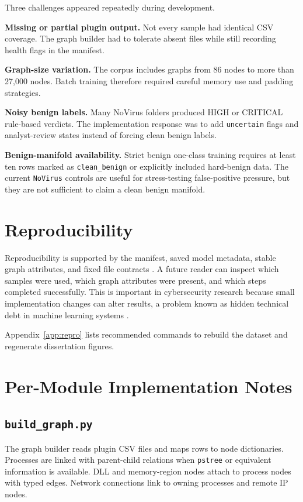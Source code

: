Three challenges appeared repeatedly during development.

\textbf{Missing or partial plugin output.} Not every sample had identical CSV coverage. The graph builder had to tolerate absent files while still recording health flags in the manifest.

\textbf{Graph-size variation.} The corpus includes graphs from 86 nodes to more than 27,000 nodes. Batch training therefore required careful memory use and padding strategies.

\textbf{Noisy benign labels.} Many NoVirus folders produced HIGH or CRITICAL rule-based verdicts. The implementation response was to add \texttt{uncertain} flags and analyst-review states instead of forcing clean benign labels.

\textbf{Benign-manifold availability.} Strict benign one-class training requires at least ten rows marked as \texttt{clean\_benign} or explicitly included hard-benign data. The current \texttt{NoVirus} controls are useful for stress-testing false-positive pressure, but they are not sufficient to claim a clean benign manifold.

\section{Reproducibility}

Reproducibility is supported by the manifest, saved model metadata, stable graph attributes, and fixed file contracts \cite{goodman2016reproducibility}. A future reader can inspect which samples were used, which graph attributes were present, and which steps completed successfully. This is important in cybersecurity research because small implementation changes can alter results, a problem known as hidden technical debt in machine learning systems \cite{sculley2015debt}.

Appendix~\ref{app:repro} lists recommended commands to rebuild the dataset and regenerate dissertation figures.

\section{Per-Module Implementation Notes}

\subsection{\texttt{build\_graph.py}}

The graph builder reads plugin CSV files and maps rows to node dictionaries. Processes are linked with parent-child relations when \texttt{pstree} or equivalent information is available. DLL and memory-region nodes attach to process nodes with typed edges. Network connections link to owning processes and remote IP nodes.

